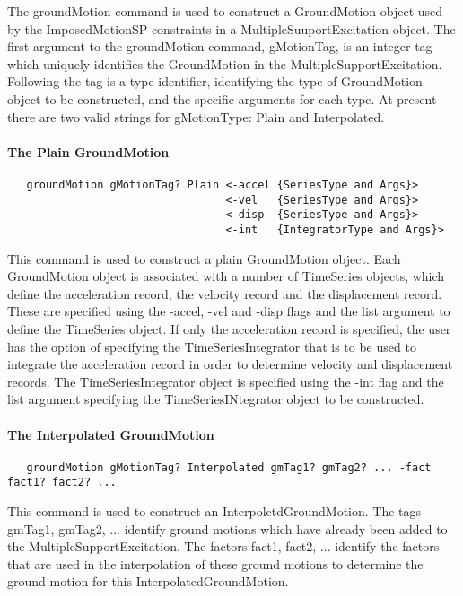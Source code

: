 \documentclass[12pt]{article}
\begin{document}
The groundMotion command is used to construct a GroundMotion object
used by the ImposedMotionSP constraints in a MultipleSuuportExcitation
object. The first argument to the groundMotion command, gMotionTag, is
an integer tag which uniquely identifies the GroundMotion in the
MultipleSupportExcitation. Following the tag is a type identifier,
identifying the type of GroundMotion object to be constructed, and the
specific arguments for each type. At present there are two valid
strings for gMotionType: Plain and Interpolated.

\paragraph{\small The Plain GroundMotion}

{\sf\small
\begin{verbatim}
   groundMotion gMotionTag? Plain <-accel {SeriesType and Args}>
                                  <-vel   {SeriesType and Args}>
                                  <-disp  {SeriesType and Args}>
                                  <-int   {IntegratorType and Args}>
\end{verbatim}
}

This command is used to construct a plain GroundMotion object. Each
GroundMotion object is associated with a number of TimeSeries objects,
which define the acceleration record, the velocity record and the
displacement record. These are specified using the -accel, -vel and
-disp flags and the list argument to define the TimeSeries object. If
only the acceleration record is specified, the user has the option of
specifying the TimeSeriesIntegrator that is to be used to integrate
the acceleration record in order to determine velocity and displacement
records. The TimeSeriesIntegrator object is specified using the -int
flag and the list argument specifying the TimeSeriesINtegrator object
to be constructed.

\paragraph{\small The Interpolated GroundMotion}

{\sf\small
\begin{verbatim}
   groundMotion gMotionTag? Interpolated gmTag1? gmTag2? ... -fact fact1? fact2? ...
\end{verbatim}
}

This command is used to construct an InterpoletdGroundMotion. The tags
gmTag1, gmTag2, ... identify ground motions which have already been
added to the MultipleSupportExcitation. The factors fact1, fact2,
... identify the factors that are used in the interpolation of these
ground motions to determine the ground motion for this
InterpolatedGroundMotion.
\end{document}
